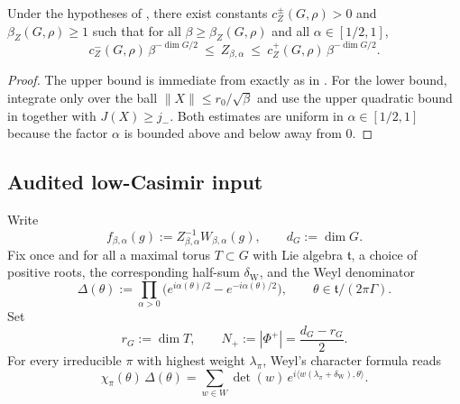 \begin{lemma}\label{lem:A1_compact_simple_partition}
Under the hypotheses of , there exist constants
$c_Z^\pm(G,\rho)>0$ and $\beta_Z(G,\rho)\ge 1$ such that for all $\beta\ge\beta_Z(G,\rho)$ and all $\alpha\in[1/2,1]$,
\begin{equation}\label{eq:A1_partition_beta_d2}
c_Z^-(G,\rho)\,\beta^{-\dim G/2}
\ \le\ Z_{\beta,\alpha}\ \le\ c_Z^+(G,\rho)\,\beta^{-\dim G/2}.
\end{equation}
\end{lemma}

\begin{proof}
The upper bound is immediate from  exactly as in .
For the lower bound, integrate only over the ball $\|X\|\le r_0/\sqrt{\beta}$ and use the upper quadratic bound in  together with $J(X)\ge j_-$.
Both estimates are uniform in $\alpha\in[1/2,1]$ because the factor $\alpha$ is bounded above and below away from $0$.
\end{proof}



\subsection{Audited low-Casimir input}

Write
\[
f_{\beta,\alpha}(g):=Z_{\beta,\alpha}^{-1}W_{\beta,\alpha}(g),
\qquad d_G:=\dim G.
\]
Fix once and for all a maximal torus $T\subset G$ with Lie algebra $\mathfrak t$, a choice of positive roots, the corresponding half-sum $\delta_{\mathrm W}$, and the Weyl denominator
\[
\Delta(\theta):=\prod_{\alpha>0}\bigl(e^{i\alpha(\theta)/2}-e^{-i\alpha(\theta)/2}\bigr),
\qquad \theta\in \mathfrak t/(2\pi\Gamma).
\]
Set
\[
r_G:=\dim T,
\qquad
N_+:=|\Phi^+|=\frac{d_G-r_G}{2}.
\]
For every irreducible $\pi$ with highest weight $\lambda_\pi$, Weyl's character formula reads
\begin{equation}\label{eq:A1_weyl_character_formula}
\chi_\pi(\theta)\,\Delta(\theta)
=
\sum_{w\in W}\det(w)\,e^{i\langle w(\lambda_\pi+\delta_{\mathrm W}),\theta\rangle}.
\end{equation}

